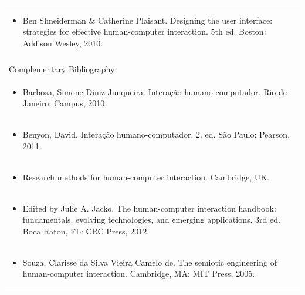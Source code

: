 \documentclass[11pt]{article}
\begin{document}
\begin{center}
\begin{longtable}{|p{4cm}|p{4cm}|p{4cm}|p{4cm}|}
\multicolumn{4}{|p{\dimexpr 16cm + 6\tabcolsep\relax}|}{\begin{itemize}\item Ben Shneiderman \& Catherine Plaisant. Designing the user interface: strategies for effective human-computer interaction. 5th ed. Boston: Addison Wesley, 2010.\end{itemize}}\\
\multicolumn{4}{|p{16cm}|}{}\\
\hline
\multicolumn{4}{|p{16cm}|}{Complementary Bibliography:}\\*
\multicolumn{4}{|p{\dimexpr 16cm + 6\tabcolsep\relax}|}{\begin{itemize}\item Barbosa, Simone Diniz Junqueira. Interação humano-computador. Rio de Janeiro: Campus, 2010.\end{itemize}}\\
\multicolumn{4}{|p{\dimexpr 16cm + 6\tabcolsep\relax}|}{\begin{itemize}\item Benyon, David. Interação humano-computador. 2. ed. São Paulo: Pearson, 2011.\end{itemize}}\\
\multicolumn{4}{|p{\dimexpr 16cm + 6\tabcolsep\relax}|}{\begin{itemize}\item Research methods for human-computer interaction. Cambridge, UK.\end{itemize}}\\
\multicolumn{4}{|p{\dimexpr 16cm + 6\tabcolsep\relax}|}{\begin{itemize}\item Edited by Julie A. Jacko. The human-computer interaction handbook: fundamentals, evolving technologies, and emerging applications. 3rd ed. Boca Raton, FL: CRC Press, 2012.\end{itemize}}\\
\multicolumn{4}{|p{\dimexpr 16cm + 6\tabcolsep\relax}|}{\begin{itemize}\item Souza, Clarisse da Silva Vieira Camelo de. The semiotic engineering of human-computer interaction. Cambridge, MA: MIT Press, 2005.\end{itemize}}\\
\hline
\end{longtable}
\end{center}
\end{document}
